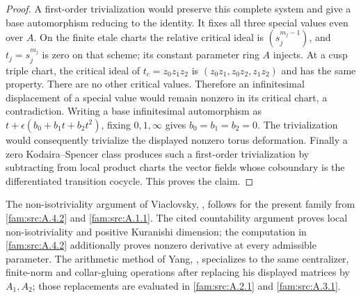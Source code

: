 \begin{proof}
A first-order trivialization would preserve this complete system and give a base automorphism reducing to the identity. It fixes all three special values even over $A$. On the finite etale charts the relative critical ideal is $(s_j^{m_j-1})$, and $t_j=s_j^{m_j}$ is zero on that scheme; its constant parameter ring $A$ injects. At a cusp triple chart, the critical ideal of $t_c=z_0z_1z_2$ is $(z_0z_1,z_0z_2,z_1z_2)$ and has the same property. There are no other critical values. Therefore an infinitesimal displacement of a special value would remain nonzero in its critical chart, a contradiction. Writing a base infinitesimal automorphism as $t+\epsilon(b_0+b_1t+b_2t^2)$, fixing $0,1,\infty$ gives $b_0=b_1=b_2=0$. The trivialization would consequently trivialize the displayed nonzero torus deformation. Finally a zero Kodaira--Spencer class produces such a first-order trivialization by subtracting from local product charts the vector fields whose coboundary is the differentiated transition cocycle. This proves the claim.
\end{proof}

\begin{proposition}\label{fam:src:A.4.3}\label{fam:st:A.4.3}
The non-isotriviality argument of Viaclovsky, \cite[Proposition 4.7]{ViaclovskyLog2026}, follows for the present family from \ref{fam:src:A.4.2} and \ref{fam:src:A.1.1}. The cited countability argument proves local non-isotriviality and positive Kuranishi dimension; the computation in \ref{fam:src:A.4.2} additionally proves nonzero derivative at every admissible parameter. The arithmetic method of Yang, \cite[Lemmas 6.6--6.9 and Proposition 6.15]{Yang2026}, specializes to the same centralizer, finite-norm and collar-gluing operations after replacing his displayed matrices by $A_1,A_2$; those replacements are evaluated in \ref{fam:src:A.2.1} and \ref{fam:src:A.3.1}.
\end{proposition}

